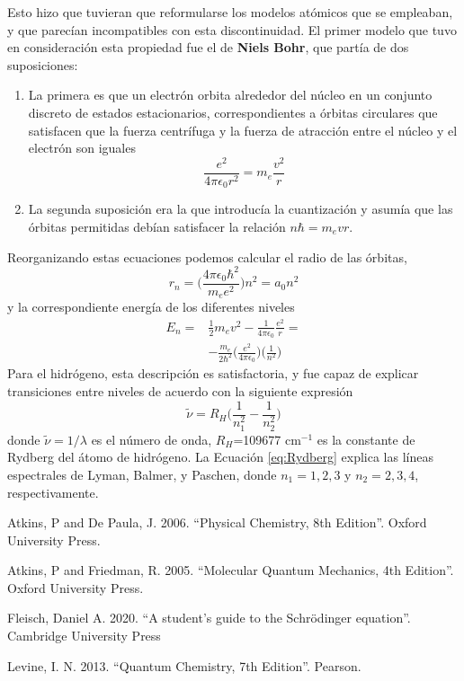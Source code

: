 \documentclass{tufte-handout}
\begin{document}
Esto hizo que tuvieran que reformularse los modelos atómicos que 
se empleaban, y que parecían incompatibles con esta discontinuidad.
El primer modelo que tuvo en consideración esta propiedad fue
el de \textbf{Niels Bohr}, que partía de dos suposiciones: 
\begin{enumerate}
    \item La primera es que un electrón orbita alrededor del
    núcleo en un conjunto discreto de estados estacionarios, 
    correspondientes a órbitas circulares que satisfacen que la
    fuerza centrífuga y la fuerza de atracción entre el núcleo y el
    electrón son iguales
    \begin{equation}
        \frac{e^2}{4\pi \epsilon_0 r^2}=m_e\frac{v^2}{r}
    \end{equation}
    \item La segunda suposición era la que introducía la cuantización
    y asumía que las órbitas permitidas debían satisfacer la relación
    $n\hbar=m_evr$.
\end{enumerate}
Reorganizando estas ecuaciones podemos calcular el radio de las órbitas,
\begin{equation}
    r_n=\bigg(\frac{4\pi \epsilon_0\hbar^2}{m_ee^2}\bigg)n^2=a_0n^2    
\end{equation}
y la correspondiente energía de los diferentes niveles
\begin{equation}
    \begin{split}
    E_n= & \frac{1}{2}m_ev^2 - \frac{1}{4\pi \epsilon_0}\frac{e^2}{r}=\\
    & -\frac{m_e}{2\hbar^2}\bigg(\frac{e^2}{4\pi\epsilon_0}\bigg)\bigg(\frac{1}{n^2}\bigg)
    \end{split}
\end{equation}
Para el hidrógeno, esta descripción es satisfactoria, y fue capaz de
explicar transiciones entre niveles de acuerdo con la siguiente 
expresión
\begin{equation}
    \tilde{\nu}=R_H\bigg(\frac{1}{n^2_1} -\frac{1}{n^2_2}\bigg) 
    \label{eq:Rydberg}
\end{equation}
donde $\tilde{\nu}=1/\lambda$ es el número de onda, $R_H$=109677 cm$^{-1}$ 
es la constante de Rydberg del átomo de hidrógeno. La Ecuación 
\ref{eq:Rydberg} explica las líneas espectrales de Lyman, Balmer, 
y Paschen, donde $n_1=1,2, 3$ y $n_2=2,3,4$, respectivamente.


\begin{thebibliography}{}
 Atkins, P and De Paula, J. 2006. ``Physical Chemistry, 8th Edition''. Oxford University Press.

 Atkins, P and Friedman, R. 2005. ``Molecular Quantum Mechanics, 4th Edition''. Oxford University Press.

 Fleisch, Daniel A. 2020. ``A student's guide to the Schr{\"o}dinger equation''. Cambridge University Press

 Levine, I. N. 2013. ``Quantum
Chemistry, 7th Edition''. Pearson.
\end{thebibliography}

\end{document}
